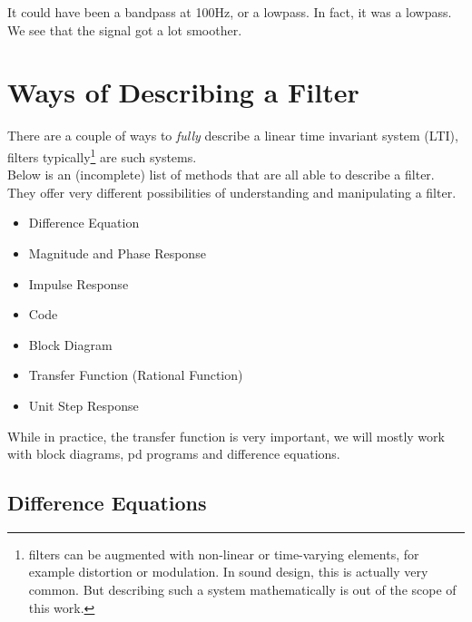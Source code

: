 \begin{Answer}
	It could have been a bandpass at 100Hz, or a lowpass. In fact, it was a lowpass. We see that the signal got a lot smoother.
\end{Answer}

\section{Ways of Describing a Filter}
There are a couple of ways to \textit{fully} describe a linear time invariant system (LTI), filters typically\footnote{filters can be augmented with non-linear or time-varying elements, for example distortion or modulation. In sound design, this is actually very common. But describing such a system mathematically is out of the scope of this work.} are such systems.\\
Below is an (incomplete) list of methods that are all able to describe a filter. They offer very different possibilities of understanding and manipulating a filter.
\begin{itemize}
	\item Difference Equation
	\item Magnitude and Phase Response
	\item Impulse Response
	\item Code
	\item Block Diagram
	\item Transfer Function (Rational Function)
	\item Unit Step Response
\end{itemize}

While in practice, the transfer function is very important, we will mostly work with block diagrams, pd programs and difference equations.

\subsection{Difference Equations}
\label{sub:diff}

